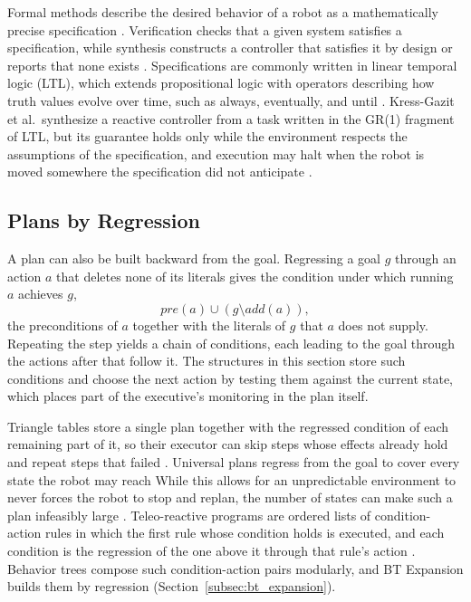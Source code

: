     \label{subsec:tp_synthesis}
    Formal methods describe the desired behavior of a robot as a mathematically precise specification \cite{kressgazit2018}.
    Verification checks that a given system satisfies a specification, while synthesis constructs a controller that satisfies it by design or reports that none exists \cite{kressgazit2018}.
    Specifications are commonly written in linear temporal logic (LTL), which extends propositional logic with operators describing how truth values evolve over time, such as always, eventually, and until \cite{pnueli1977}.
    Kress-Gazit et al.\ synthesize a reactive controller from a task written in the GR(1) fragment of LTL, but its guarantee holds only while the environment respects the assumptions of the specification, and execution may halt when the robot is moved somewhere the specification did not anticipate \cite{kressgazit2009}.

    \subsection{Plans by Regression}
    \label{subsec:tp_regression}
    A plan can also be built backward from the goal.
    Regressing a goal $g$ through an action $a$ that deletes none of its literals gives the condition under which running $a$ achieves $g$,
    \begin{equation}
        pre(a) \cup (g \setminus add(a)),
        \label{eq:regression}
    \end{equation}
    the preconditions of $a$ together with the literals of $g$ that $a$ does not supply. %
    Repeating the step yields a chain of conditions, each leading to the goal through the actions after that follow it.
    The structures in this section store such conditions and choose the next action by testing them against the current state, which places part of the executive's monitoring in the plan itself.
    
    Triangle tables store a single plan together with the regressed condition of each remaining part of it, so their executor can skip steps whose effects already hold and repeat steps that failed \cite{fikes1972}. %
    Universal plans regress from the goal to cover every state the robot may reach \cite{schoppers1987}
    While this allows for an unpredictable environment to never forces the robot to stop and replan, the number of states can make such a plan infeasibly large \cite{ginsberg1989}.
    Teleo-reactive programs are ordered lists of condition-action rules in which the first rule whose condition holds is executed, and each condition is the regression of the one above it through that rule's action \cite{nilsson1994}.
    Behavior trees compose such condition-action pairs modularly, and BT Expansion builds them by regression (Section~\ref{subsec:bt_expansion}).

